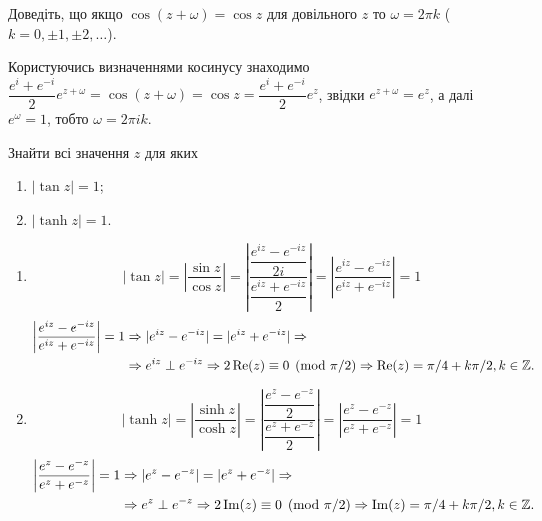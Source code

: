 \begin{solution}
\end{solution}

\begin{problem}[Волковиський, 65]
    Доведіть, що якщо $\cos(z + \omega) = \cos z$ для довільного $z$ то $\omega = 2 \pi k$ ($k=0,\pm1,\pm2,\ldots$).
\end{problem}

\begin{solution}
Користуючись визначеннями косинусу знаходимо $\dfrac{e^{i} + e^{-i}}{2} e^{z + \omega} = \cos(z + \omega) = \cos z = \dfrac{e^{i} + e^{-i}}{2} e^z$, звідки $e^{z+\omega} = e^z$, а далі $e^\omega = 1$, тобто $\omega = 2\pi i k$.
\end{solution}

\begin{problem}[Волковиський, 70]
    Знайти всі значення $z$ для яких
    \begin{enumerate}
        \item $|\tan z| = 1$;
        \item $|\tanh z| = 1$.
    \end{enumerate}
\end{problem}

\begin{solution}
\begin{enumerate}
\item 
\[
|\tan z| = \left| \dfrac {\sin z} {\cos z} \right| = \left| \dfrac {\dfrac{e^{iz} - e^{-iz}}{2i}} {\dfrac{e^{iz} + e^{-iz}}{2}} \right| = \left| \dfrac {e^{iz} - e^{-iz}} {e^{iz} + e^{-iz}} \right| = 1 
\]
\begin{equation*}
\begin{aligned}
\left| \dfrac {e^{iz} - e^{-iz}} {e^{iz} + e^{-iz}} \right| = 1 &\Rightarrow |e^{iz} - e^{-iz}| = |e^{iz} + e^{-iz}| \Rightarrow \\
&\Rightarrow e^{iz} \perp e^{-iz} \Rightarrow 2\operatorname{Re}(z) \equiv 0 \pmod {\pi / 2} \Rightarrow \operatorname{Re}(z) = \pi / 4 + k \pi / 2, k \in \mathbb{Z}.
\end{aligned}
\end{equation*}
\item
\[
|\tanh z| = \left| \dfrac {\sinh z} {\cosh z} \right| = \left| \dfrac {\dfrac{e^{z} - e^{-z}}{2}} {\dfrac{e^{z} + e^{-z}}{2}} \right| = \left| \dfrac {e^{z} - e^{-z}} {e^{z} + e^{-z}} \right| = 1 
\]
\begin{equation*}
\begin{aligned}
\left| \dfrac {e^{z} - e^{-z}} {e^{z} + e^{-z}} \right| = 1 &\Rightarrow |e^{z} - e^{-z}| = |e^{z} + e^{-z}| \Rightarrow\\
&\Rightarrow e^{z} \perp e^{-z} \Rightarrow 2\operatorname{Im}(z) \equiv 0 \pmod {\pi / 2} \Rightarrow \operatorname{Im}(z) = \pi / 4 + k \pi / 2, k \in \mathbb{Z}.
\end{aligned}
\end{equation*}

\end{enumerate}
\end{solution}

